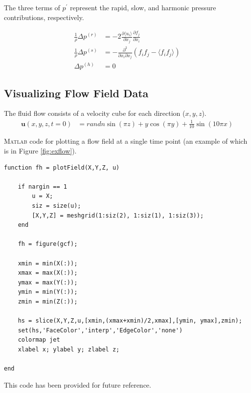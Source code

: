 \documentclass[paper=a4, fontsize=11pt]{scrartcl} %
\numberwithin{equation}{section} %
\numberwithin{figure}{section} %
\numberwithin{table}{section} %
\begin{document}
The three terms of $p^{'}$ represent the rapid, slow, and harmonic pressure contributions, respectively.


\begin{align}
    \frac{1}{\rho} \Delta p^{(r)} &= -2 \frac{ \partial \langle u_i \rangle }{\partial x_j}
            \frac{\partial f_j}{\partial x_i} \\
    \frac{1}{\rho} \Delta p^{(s)} &= - \frac{\partial^2}{\partial x_i \partial x_j}
            \left( 
                f_i f_j - \langle f_i f_j \rangle 
            \right ) \\
    \Delta p^{(h)} &= 0
\end{align}


\subsection{Visualizing Flow Field Data}

The fluid flow consists of a velocity cube for each direction ($x,y,z$).
\begin{align}
    \bm{u}(x,y,z,t=0) &= randn \sin (\pi z) + y \cos(\pi y) + \frac{1}{10}\sin(10 \pi x)
    \label{eq1}
\end{align}



\textsc{Matlab} code for plotting a flow field at a single time point (an example of which is in Figure \ref{fig:exflow}).
\begin{lstlisting}
function fh = plotField(X,Y,Z, u)

    if nargin == 1
        u = X;
        siz = size(u);
        [X,Y,Z] = meshgrid(1:siz(2), 1:siz(1), 1:siz(3));
    end

    fh = figure(gcf);

    xmin = min(X(:));
    xmax = max(X(:));
    ymax = max(Y(:));
    ymin = min(Y(:));
    zmin = min(Z(:));

    hs = slice(X,Y,Z,u,[xmin,(xmax+xmin)/2,xmax],[ymin, ymax],zmin);
    set(hs,'FaceColor','interp','EdgeColor','none')
    colormap jet
    xlabel x; ylabel y; zlabel z;

end
\end{lstlisting}


This code has been provided for future reference.
\end{document}
